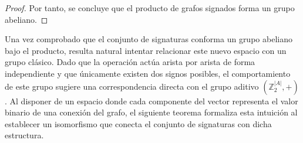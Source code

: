 \documentclass[11pt,a4paper,spanish]{report}
\theoremstyle{plain}
\begin{document}
\begin{proof}
Por tanto, se concluye que el producto de grafos signados forma un grupo abeliano.
\end{proof}



Una vez comprobado que el conjunto de signaturas conforma un grupo abeliano bajo el producto, resulta natural intentar relacionar este nuevo espacio con un grupo clásico. Dado que la operación actúa arista por arista de forma independiente y que únicamente existen dos signos posibles, el comportamiento de este grupo sugiere una correspondencia directa con el grupo aditivo $(\mathbb{Z}_2^{|A|}, +)$. Al disponer de un espacio donde cada componente del vector representa el valor binario de una conexión del grafo, el siguiente teorema formaliza esta intuición al establecer un isomorfismo que conecta el conjunto de signaturas con dicha estructura.
\end{document}
